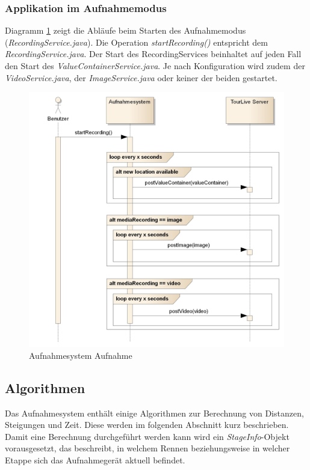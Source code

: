 \subsubsection{Applikation im Aufnahmemodus}
Diagramm \ref{fig:recording} zeigt die Abläufe beim Starten des Aufnahmemodus (\textit{RecordingService.java}). Die Operation \textit{startRecording()} entspricht dem \textit{RecordingService.java}. Der Start des RecordingServices beinhaltet auf jeden Fall den Start des  \textit{ValueContainerService.java}. Je nach Konfiguration wird zudem der \textit{VideoService.java}, der \textit{ImageService.java} oder keiner der beiden gestartet.

\begin{figure}[H]
	\centering
	\includegraphics[width=130mm]{images/android/recording.jpg}
	\caption{Aufnahmesystem Aufnahme}
	\label{fig:recording}
\end{figure}

\subsection{Algorithmen}
Das Aufnahmesystem enthält einige Algorithmen zur Berechnung von Distanzen, Steigungen und Zeit. Diese werden im folgenden Abschnitt kurz beschrieben. Damit eine Berechnung durchgeführt werden kann wird ein \textit{StageInfo}-Objekt vorausgesetzt, das beschreibt, in welchem Rennen beziehungsweise in welcher Etappe sich das Aufnahmegerät aktuell befindet.
\\

